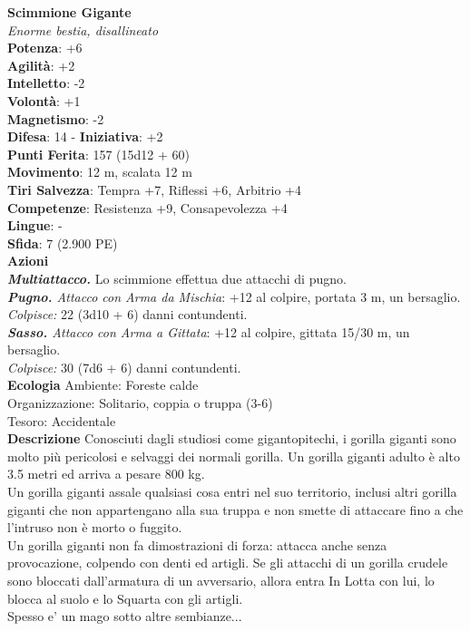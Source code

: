 \begin{multicols}{2}
\medskip\textbf{Scimmione Gigante}\\
\emph{Enorme bestia, disallineato}\\
\textbf{Potenza}: +6\\
\textbf{Agilità}: +2\\
\textbf{Intelletto}: -2\\
\textbf{Volontà}: +1\\
\textbf{Magnetismo}: -2\\
\textbf{Difesa}: 14 - \textbf{Iniziativa}: +2\\
\textbf{Punti Ferita}: 157 (15d12 + 60)\\
\textbf{Movimento}: 12 m, scalata 12 m\\
\textbf{Tiri Salvezza}: Tempra +7, Riflessi +6, Arbitrio +4\\
\textbf{Competenze}: Resistenza +9, Consapevolezza +4\\
\textbf{Lingue}: -\\
\textbf{Sfida}: 7 (2.900 PE)\smallskip\\
\smallskip\textbf{Azioni}\\
\emph{\textbf{Multiattacco.}} Lo scimmione effettua due attacchi di pugno.\\
\emph{\textbf{Pugno.} Attacco con Arma da Mischia}: +12 al colpire, portata 3 m, un bersaglio.\\
\emph{Colpisce:} 22 (3d10 + 6) danni contundenti. \\
\emph{\textbf{Sasso.} Attacco con Arma a Gittata}: +12 al colpire, gittata 15/30 m, un bersaglio.\\
\emph{Colpisce:} 30 (7d6 + 6) danni contundenti.\\
\textbf{Ecologia}
Ambiente: Foreste calde\\
Organizzazione: Solitario, coppia o truppa (3-6)\\
Tesoro: Accidentale\\
\textbf{Descrizione}
Conosciuti dagli studiosi come gigantopitechi, i gorilla giganti sono molto più pericolosi e selvaggi dei normali gorilla. Un gorilla giganti adulto è alto 3.5 metri ed arriva a pesare 800 kg.\\
Un gorilla giganti assale qualsiasi cosa entri nel suo territorio, inclusi altri gorilla giganti che non appartengano alla sua truppa e non smette di attaccare fino a che l’intruso non è morto o fuggito.\\
Un gorilla giganti non fa dimostrazioni di forza: attacca anche senza provocazione, colpendo con denti ed artigli. Se gli attacchi di un gorilla crudele sono bloccati dall’armatura di un avversario, allora entra In Lotta con lui, lo blocca al suolo e lo Squarta con gli artigli.\\
Spesso e' un mago sotto altre sembianze...\\



\end{multicols}
